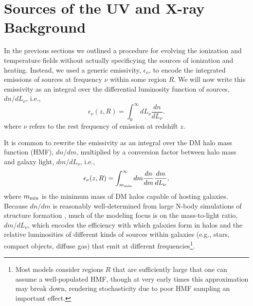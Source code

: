 %
%

\section{Sources of the UV and X-ray Background} \label{sec:sources}
In the previous sections we outlined a procedure for evolving the ionization and temperature fields without actually specificying the sources of ionization and heating. Instead, we used a generic emissivity, $\epsilon_{\nu}$, to encode the integrated emissions of sources at frequency $\nu$ within some region $R$. We will now write this emissivity as an integral over the differential luminosity function of sources, $dn/dL_{\nu}$, i.e.,
\begin{equation}
	\epsilon_{\nu}(z,R) = \int_0^{\infty} dL_{\nu} \frac{dn}{dL_{\nu}} .
\end{equation}
where $\nu$ refers to the rest frequency of emission at redshift $z$.

It is common to rewrite the emissivity as an integral over the DM halo mass function (HMF), $dn/dm$, multiplied by a conversion factor between halo mass and galaxy light, $dm/dL_{\nu}$, i.e.,
\begin{equation}
	\epsilon_{\nu}(z,R) = \int_{m_{\text{min}}}^{\infty} dm \frac{dn}{dm} \frac{dm}{d L_{\nu}} ,
\end{equation}
where $m_{\text{min}}$ is the minimum mass of DM halos capable of hosting galaxies. Because $dn/dm$ is reasonably well-determined from large N-body simulations of structure formation \cite{PS1974,SMT2001,Tinker2010}, much of the modeling focus is on the mass-to-light ratio, $dm/dL_{\nu}$, which encodes the efficiency with which galaxies form in halos and the relative luminosities of different kinds of sources within galaxies (e.g., stars, compact objects, diffuse gas) that emit at different frequencies\footnote{Most models consider regions $R$ that are sufficiently large that one can assume a well-populated HMF, though at very early times this approximation may break down, rendering stochasticity due to poor HMF sampling an important effect.}. 

